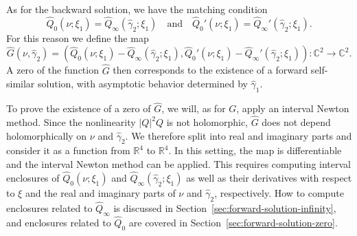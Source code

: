 \documentclass[11pt]{article}
\begin{document}
As for the backward solution, we have the matching condition
\begin{equation}\label{eq:Q-hat-match}
  \hat{Q}_{0}(\nu; \xi_{1}) = \hat{Q}_{\infty}(\hat{\gamma}_{2}; \xi_{1})
  \quad\text{and}\quad
  \hat{Q}_{0}'(\nu; \xi_{1}) = \hat{Q}_{\infty}'(\hat{\gamma}_{2}; \xi_{1}).
\end{equation}
For this reason we define the map
\begin{equation}\label{eq:G-hat}
  \hat{G}(\nu, \hat{\gamma}_{2}) = \left(
  \hat{Q}_{0}(\nu; \xi_{1}) - \hat{Q}_{\infty}(\hat{\gamma}_{2}; \xi_{1}),
  \hat{Q}_{0}'(\nu; \xi_{1}) - \hat{Q}_{\infty}'(\hat{\gamma}_{2}; \xi_{1})
  \right) \colon \mathbb{C}^{2} \to \mathbb{C}^{2}.
\end{equation}
A zero of the function \(\hat{G}\) then corresponds to the existence
of a forward self-similar solution, with asymptotic behavior
determined by \(\hat{\gamma}_{1}\).

To prove the existence of a zero of \(\hat{G}\), we will, as for
\(G\), apply an interval Newton method. Since the nonlinearity
\(|Q|^{2}Q\) is not holomorphic, \(\hat{G}\) does not depend
holomorphically on \(\nu\) and \(\hat{\gamma}_{2}\). We therefore
split into real and imaginary parts and consider it as a function from
\(\mathbb{R}^{4}\) to \(\mathbb{R}^{4}\). In this setting, the map is
differentiable and the interval Newton method can be applied. This
requires computing interval enclosures of
\(\hat{Q}_{0}(\nu; \xi_{1})\) and
\(\hat{Q}_{\infty}(\hat{\gamma}_{2}; \xi_{1})\) as well as their
derivatives with respect to \(\xi\) and the real and imaginary parts
of \(\nu\) and \(\hat{\gamma}_{2}\), respectively. How to compute
enclosures related to \(\hat{Q}_{\infty}\) is discussed in
Section~\ref{sec:forward-solution-infinity}, and enclosures related to
\(\hat{Q}_{0}\) are covered in
Section~\ref{sec:forward-solution-zero}.
\end{document}
